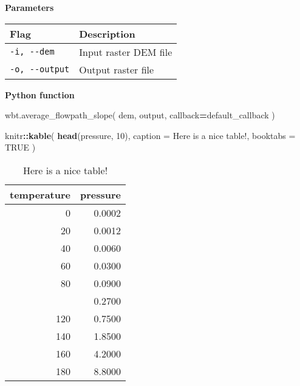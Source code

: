 \documentclass[
]{book}
\newenvironment{Shaded}{\begin{snugshade}}{\end{snugshade}}
\newcommand{\AttributeTok}[1]{\textcolor[rgb]{0.13,0.29,0.53}{#1}}
\newcommand{\ConstantTok}[1]{\textcolor[rgb]{0.56,0.35,0.01}{#1}}
\newcommand{\DecValTok}[1]{\textcolor[rgb]{0.00,0.00,0.81}{#1}}
\newcommand{\FunctionTok}[1]{\textcolor[rgb]{0.13,0.29,0.53}{\textbf{#1}}}
\newcommand{\NormalTok}[1]{#1}
\newcommand{\OperatorTok}[1]{\textcolor[rgb]{0.81,0.36,0.00}{\textbf{#1}}}
\newcommand{\SpecialCharTok}[1]{\textcolor[rgb]{0.81,0.36,0.00}{\textbf{#1}}}
\newcommand{\StringTok}[1]{\textcolor[rgb]{0.31,0.60,0.02}{#1}}
\theoremstyle{definition}
\theoremstyle{definition}
\theoremstyle{definition}
\theoremstyle{definition}
\theoremstyle{remark}
\begin{document}
\textbf{Parameters}

\begin{longtable}[]{@{}ll@{}}
\toprule\noalign{}
Flag & Description \\
\midrule\noalign{}
\endhead
\bottomrule\noalign{}
\endlastfoot
\texttt{-i,\ -\/-dem} & Input raster DEM file \\
\texttt{-o,\ -\/-output} & Output raster file \\
\end{longtable}

\textbf{Python function}

\begin{Shaded}
\begin{Highlighting}[]
\NormalTok{wbt.average\_flowpath\_slope(}
\NormalTok{    dem,}
\NormalTok{    output,}
\NormalTok{    callback}\OperatorTok{=}\NormalTok{default\_callback}
\NormalTok{)}
\end{Highlighting}
\end{Shaded}

\begin{Shaded}
\begin{Highlighting}[]
\NormalTok{knitr}\SpecialCharTok{::}\FunctionTok{kable}\NormalTok{(}
  \FunctionTok{head}\NormalTok{(pressure, }\DecValTok{10}\NormalTok{), }\AttributeTok{caption =} \StringTok{\textquotesingle{}Here is a nice table!\textquotesingle{}}\NormalTok{,}
  \AttributeTok{booktabs =} \ConstantTok{TRUE}
\NormalTok{)}
\end{Highlighting}
\end{Shaded}

\begin{table}

\caption{\label{tab:nice-tab}Here is a nice table!}
\centering
\begin{tabular}[t]{rr}
\toprule
temperature & pressure\\
\midrule
0 & 0.0002\\
20 & 0.0012\\
40 & 0.0060\\
60 & 0.0300\\
80 & 0.0900\\
\addlinespace
100 & 0.2700\\
120 & 0.7500\\
140 & 1.8500\\
160 & 4.2000\\
180 & 8.8000\\
\bottomrule
\end{tabular}
\end{table}
\end{document}
